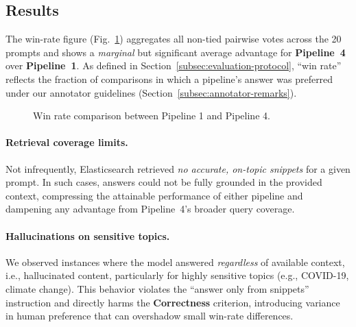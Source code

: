 \documentclass[manuscript,screen]{acmart}
\begin{document}
\begin{CCSXML}
	
\section{Results}
\label{sec:results}
	
The win-rate figure (Fig.~\ref{fig:winrate-overall}) aggregates all non-tied
pairwise votes across the 20 prompts and shows a \emph{marginal} but significant average
advantage for \textbf{Pipeline~4} over \textbf{Pipeline~1}. As defined in
Section~\ref{subsec:evaluation-protocol}, “win rate” reflects the fraction of
comparisons in which a pipeline’s answer was preferred under our annotator
guidelines (Section~\ref{subsec:annotator-remarks}).

\begin{figure}[H]
\centering
{}
\caption{Win rate comparison between Pipeline 1 and Pipeline 4.}
\label{fig:winrate-overall}
\end{figure}

\paragraph{Retrieval coverage limits.}
Not infrequently, Elasticsearch retrieved \emph{no accurate, on-topic snippets}
for a given prompt. In such cases, answers could not be fully grounded in the
provided context, compressing the attainable performance of either pipeline and
dampening any advantage from Pipeline~4’s broader query coverage.

\paragraph{Hallucinations on sensitive topics.}
We observed instances where the model answered \emph{regardless} of available
context, i.e., hallucinated content, particularly for highly sensitive topics
(e.g., COVID-19, climate change). This behavior violates the “answer only from
snippets” instruction and directly harms the \textbf{Correctness} criterion,
introducing variance in human preference that can overshadow small win-rate
differences.


\end{CCSXML}
\end{document}

